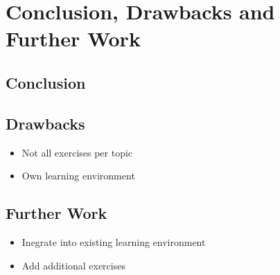 \chapter{Conclusion, Drawbacks and Further Work}

\section{Conclusion}

%

\section{Drawbacks}

\begin{itemize}
    \item Not all exercises per topic
    \item Own learning environment
\end{itemize}

\section{Further Work}

\begin{itemize}
    \item Inegrate into existing learning environment
    \item Add additional exercises
\end{itemize}